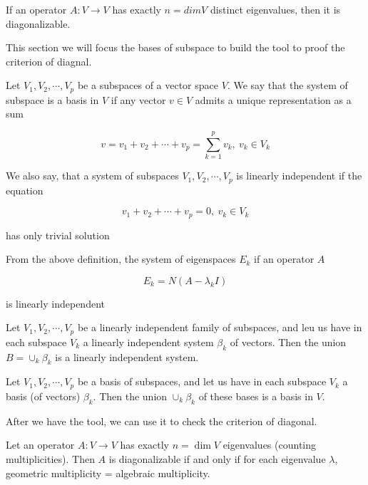 \begin{cor*}
	If an operator $A: V \rightarrow V$ has exactly $n = dim V$ distinct eigenvalues, then it is diagonalizable.
\end{cor*}

\begin{tcolorbox}
	This section we will focus the bases of subspace to build the tool to proof the criterion of diagnal.
\end{tcolorbox}

\begin{defn}
	Let $V_1,V_2,\cdots,V_p$ be a subspaces of a vector space $V$. We say that the system of subspace is a basis in $V$ if any vector $v \in V$ admits a unique representation as a sum
	
	$$v = v_1 + v_2 + \cdots + v_p = \sum^p_{k=1}v_k,~v_k \in V_k$$
	
	We also say, that a system of subspaces $V_1,V_2,\cdots,V_p$ is linearly independent if the equation 
	
	$$v_1 + v_2 + \cdots + v_p = 0,~v_k \in V_k$$
	
	has only trivial solution
\end{defn}

\begin{rmk*}
	From the above definition, the system of eigenspaces $E_k$ if an operator $A$
	
	$$E_k = N(A - \lambda_k I)$$
	
	is linearly independent 
\end{rmk*}

\begin{lmma*}
	Let $V_1,V_2,\cdots,V_p$ be a linearly independent family of subspaces, and leu us have in each subspace $V_k$ a linearly independent system $\beta_k$ of vectors. Then the union $B = \cup_k\beta_k$ is a linearly independent system.
\end{lmma*}

\begin{thm*}
	Let $V_1,V_2,\cdots,V_p$ be a basis of subspaces, and let us have in each subspace $V_k$ a basis (of vectors) $\beta_k$. Then the union $\cup_k\beta_k$ of these bases is a basis in $V$.
\end{thm*}

\begin{tcolorbox}
	After we have the tool, we can use it to check the criterion of diagonal.
\end{tcolorbox}

\begin{thm*}
	Let an operator $A:V\rightarrow V$ has exactly $n = \dim V$ eigenvalues (counting multiplicities). Then $A$ is diagonalizable if and only if for each eigenvalue $\lambda$, geometric multiplicity = algebraic multiplicity.
\end{thm*}

